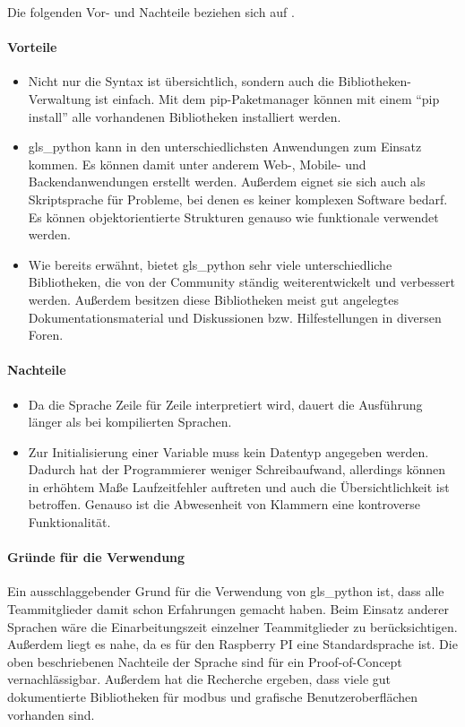 Die folgenden Vor- und Nachteile beziehen sich auf \textcite[vgl.][]{Ceaseo:2020}.
\paragraph{Vorteile}
\begin{itemize}
	\item Nicht nur die Syntax ist übersichtlich, sondern auch die Bibliotheken-Verwaltung ist einfach. Mit dem pip-Paketmanager können mit einem \enquote{pip install} alle vorhandenen Bibliotheken installiert werden.
	\item \gls{gls_python} kann in den unterschiedlichsten Anwendungen zum Einsatz kommen. Es können damit unter anderem Web-, Mobile- und Backendanwendungen erstellt werden. Außerdem eignet sie sich auch als Skriptsprache für Probleme, bei denen es keiner komplexen Software bedarf. Es können objektorientierte Strukturen genauso wie funktionale verwendet werden. 
	\item Wie bereits erwähnt, bietet \gls{gls_python} sehr viele unterschiedliche Bibliotheken, die von der Community ständig weiterentwickelt und verbessert werden. Außerdem besitzen diese Bibliotheken meist gut angelegtes Dokumentationsmaterial und Diskussionen bzw. Hilfestellungen in diversen Foren.
\end{itemize}

\paragraph{Nachteile}
\begin{itemize}{}{}
	\item Da die Sprache Zeile für Zeile interpretiert wird, dauert die Ausführung länger als bei kompilierten Sprachen.
	\item Zur Initialisierung einer Variable muss kein Datentyp angegeben werden. Dadurch hat der Programmierer weniger Schreibaufwand, allerdings können in erhöhtem Maße Laufzeitfehler auftreten und auch die Übersichtlichkeit ist betroffen. Genauso ist die Abwesenheit von Klammern eine kontroverse Funktionalität.
\end{itemize}

\paragraph{Gründe für die Verwendung}
Ein ausschlaggebender Grund für die Verwendung von \gls{gls_python} ist, dass alle Teammitglieder damit schon Erfahrungen gemacht haben. Beim Einsatz anderer Sprachen wäre die Einarbeitungszeit einzelner Teammitglieder zu berücksichtigen. Außerdem liegt es nahe, da es für den Raspberry PI eine Standardsprache ist. Die oben beschriebenen Nachteile der Sprache sind für ein Proof-of-Concept vernachlässigbar. Außerdem hat die Recherche ergeben, dass viele gut dokumentierte Bibliotheken für \gls{modbus} und grafische Benutzeroberflächen vorhanden sind.


